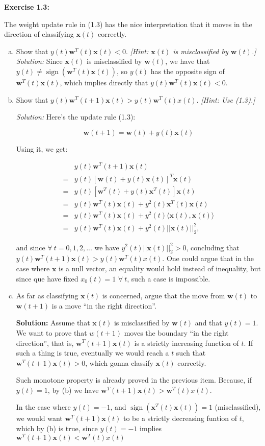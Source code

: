 \documentclass[12pt,letterpaper]{article}
\newcommand{\bx}{\boldsymbol{x}}
\newcommand{\bw}{\boldsymbol{w}}
\newcommand{\sign}{\operatorname{sign}}
\begin{document}
	\textbf{Exercise 1.3:}\cite{yaser2012learning} 
	
	The weight update rule in (1.3) has the nice interpretation that it moves in the direction of classifying $\bx(t)$ correctly. 
	\begin{enumerate}[(a)]
		\item Show that $y(t)\bw^{T}(t)\bx(t)<0.$ \emph{[Hint: $\bx(t)$ is misclassified by $\bw(t)$.]}
		\subitem \textit{Solution:}
		Since $\bx(t)$ is misclassified by $\bw(t)$, we have that $y(t)\neq\sign(\bw^{T}(t)\bx(t))$, so $y(t)$ has the opposite sign of $\bw^{T}(t)\bx(t)$, which implies directly that $y(t)\bw^{T}(t)\bx(t)<0.$
		
		\item Show that $y(t)\bw^{T}(t+1)\bx(t)>y(t)\bw^{T}(t)x(t)$. \emph{[Hint: Use (1.3).]}
		
		\subitem \textit{Solution:}
			Here's the update rule (1.3): 
			
			$$\bw(t+1)=\bw(t)+y(t)\bx(t)$$
			
			Using it, we get:
			
			\begin{align*}
				 &y(t)\bw^{T}(t+1)\bx(t)\\
				=&y(t)[\bw(t)+y(t)\bx(t)]^{T}\bx(t)\\
				=&y(t)[\bw^{T}(t)+y(t)\bx^{T}(t)]\bx(t)\\
				=&y(t)\bw^{T}(t)\bx(t)+y^2(t)\bx^{T}(t)\bx(t)\\
				=&y(t)\bw^{T}(t)\bx(t)+y^2(t)\langle\bx(t),\bx(t)\rangle\\
				=&y(t)\bw^{T}(t)\bx(t)+y^2(t)||\bx(t)||_2^2,
			\end{align*}
			
			and since $\forall ~t=0,1,2,...$ we have $y^2(t)||\bx(t)||_2^2>0$, concluding that $y(t)\bw^{T}(t+1)\bx(t)>y(t)\bw^{T}(t)x(t)$. One could argue that in the case where $\bx$ is a null vector, an equality would hold instead of inequality, but since que have fixed $x_0(t)=1$ $\forall ~t$, such a case is impossible.
		
		\item As far as classifying $\bx(t)$ is concerned, argue that the move from $\bw(t)$ to $\bw(t+1)$ is a move ``in the right direction''.
		
		\subitem \textbf{Solution:} Assume that $\bx(t)$ is misclassified by $\bw(t)$ and that $y(t)=1$. We want to prove that $w(t+1)$ moves the boundary ``in the right direction'', that is, $\bw^{T}(t+1)\bx(t)$ is a strictly increasing function of $t$. If such a thing is true, eventually we would reach a $t$ such that $\bw^{T}(t+1)\bx(t)>0$, which gonna classify $\bx(t)$ correctly.
		
		Such monotone property is already proved in the previous item. Because, if $y(t)=1$, by (b) we have $\bw^{T}(t+1)\bx(t)>\bw^{T}(t)x(t)$.
		
		In the case where $y(t)=-1$, and $\sign(\bx^{T}(t)\bx(t))=1$ (misclassified), we would want $\bw^{T}(t+1)\bx(t)$ to be a strictly decreasing funtion of $t$, which by (b) is true, since $y(t)=-1$ implies $\bw^{T}(t+1)\bx(t)<\bw^{T}(t)x(t)$
		
		\textbf{}		 
	\end{enumerate}
	
\newpage



\end{document}
